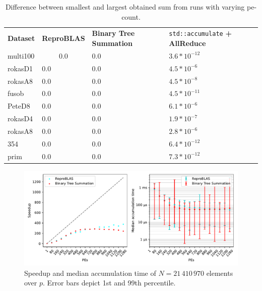 \begin{table}
\centering
\begin{tabular}{llll}
\textbf{Dataset} & \textbf{ReproBLAS }& \textbf{Binary Tree Summation} & \texttt{std::accumulate}\textbf{ + AllReduce} \\
multi100 & $$0.0$$ & $0.0$ & $3.6 * 10^{-12}$ \\
rokasD1 & $0.0$ & $0.0$ & $4.5 * 10^{-6}$ \\
rokasA8 & $0.0$ & $0.0$ & $4.5 * 10^{-8}$ \\
fusob & $0.0$ & $0.0$ & $4.5 * 10^{-11}$ \\
PeteD8 & $0.0$ & $0.0$ & $6.1 * 10^{-6}$ \\
rokasD4 & $0.0$ & $0.0$ & $1.9 * 10^{-7}$ \\
rokasA8 & $0.0$ & $0.0$ & $2.8 * 10^{-6}$ \\
354 & $0.0$ & $0.0$ & $6.4 * 10^{-12}$ \\
prim & $0.0$ & $0.0$ & $7.3 * 10^{-12}$
\end{tabular}
\caption{Difference between smallest and largest obtained sum from runs with varying \gls{pe}-count.}
\label{table:runDeviation}
\end{table}

\begin{figure}
\centering
\includegraphics[scale=0.72]{figures/scaling.pdf}
\caption[Speedup and median accumulation time of $N=21\,410\,970$ elements over $p$.]{Speedup and median accumulation time of $N=21\,410\,970$ elements over $p$. Error bars depict 1st and 99th percentile.}
\label{fig:ClusterScaling}
\end{figure}